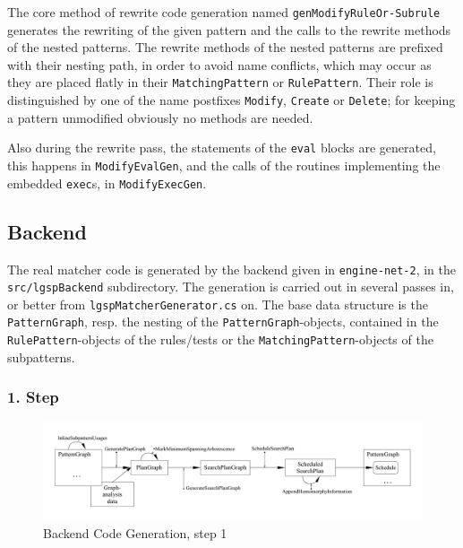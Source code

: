 The core method of rewrite code generation named \texttt{gen\-Modify\-Rule\-Or-Subrule} generates the rewriting of the given pattern and the calls to the rewrite methods of the nested patterns.
The rewrite methods of the nested patterns are prefixed with their nesting path, in order to avoid name conflicts, which may occur as they are placed flatly in their \texttt{Matching\-Pattern} or \texttt{Rule\-Pattern}.
Their role is distinguished by one of the name postfixes \texttt{Modify}, \texttt{Create} or \texttt{Delete}; for keeping a pattern unmodified obviously no methods are needed.

Also during the rewrite pass, the statements of the \texttt{eval} blocks are generated, this happens in \texttt{Modify\-Eval\-Gen}, and the calls of the routines implementing the embedded \texttt{exec}s, in \texttt{Modify\-Exec\-Gen}.

\pagebreak

\subsection{Backend}

The real matcher code is generated by the backend given in \texttt{engine-net-2}, in the \texttt{src/lgsp\-Backend} subdirectory.
The generation is carried out in several passes in, or better from \texttt{lgsp\-Matcher\-Generator.cs} on.
The base data structure is the \texttt{PatternGraph}, resp. the nesting of the \texttt{PatternGraph}-objects, contained in the \texttt{RulePattern}-objects of the rules/tests or the \texttt{Matching\-Pattern}-objects of the subpatterns.

\subsubsection*{1. Step}

\begin{figure}[htbp]
  \centering
  \includegraphics[width=\textwidth]{fig/AblaufCodeerzeugungBackend1}
  \caption{Backend Code Generation, step 1}
  \label{figbackendcodegen1}
\end{figure}

